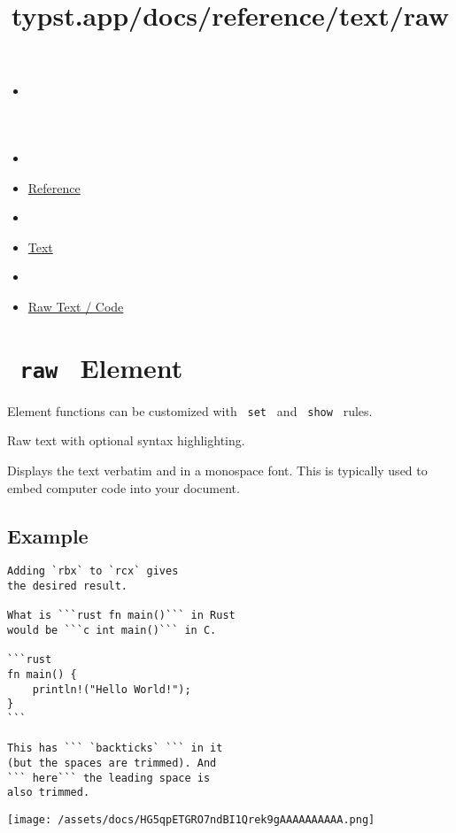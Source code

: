\title{typst.app/docs/reference/text/raw}

\begin{itemize}
\tightlist
\item
  \href{/docs}{}
\item
  
\item
  \href{/docs/reference/}{Reference}
\item
  
\item
  \href{/docs/reference/text/}{Text}
\item
  
\item
  \href{/docs/reference/text/raw/}{Raw Text / Code}
\end{itemize}

\section{\texorpdfstring{\texttt{\ raw\ } {{ Element
}}}{ raw   Element }}\label{summary}

\label{element-tooltip}
Element functions can be customized with \texttt{\ set\ } and
\texttt{\ show\ } rules.

Raw text with optional syntax highlighting.

Displays the text verbatim and in a monospace font. This is typically
used to embed computer code into your document.

\subsection{Example}\label{example}

\begin{verbatim}
Adding `rbx` to `rcx` gives
the desired result.

What is ```rust fn main()``` in Rust
would be ```c int main()``` in C.

```rust
fn main() {
    println!("Hello World!");
}
```

This has ``` `backticks` ``` in it
(but the spaces are trimmed). And
``` here``` the leading space is
also trimmed.
\end{verbatim}

\texttt{[image: /assets/docs/HG5qpETGRO7ndBI1Qrek9gAAAAAAAAAA.png]}

